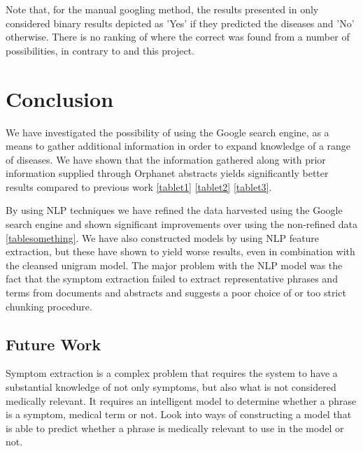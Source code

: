 \documentclass[10pt,letterpaper,final]{article}
\begin{document}

Note that, for the manual googling method, the results presented in
\cite{googlingdiagnosis} only considered binary results depicted as
'Yes' if they predicted the diseases and 'No' otherwise. There is no
ranking of where the correct was found from a number of possibilities,
in contrary to \cite{jensenandersen} and this project.




\section{Conclusion}
\label{chap:conclusion}
We have investigated the possibility of using the Google search engine,
as a means to gather additional information in order to expand knowledge
of a range of diseases. We have shown that the information gathered
along with prior information supplied through Orphanet abstracts yields
significantly better results compared to previous work \ref{tablet1}
\ref{tablet2} \ref{tablet3}.

By using NLP techniques we have refined the data harvested using the
Google search engine and shown significant improvements over using the
non-refined data \ref{tablesomething}. We have also constructed models
by using NLP feature extraction, but these have shown to yield worse
results, even in combination with the cleansed unigram model. The major
problem with the NLP model was the fact that the symptom extraction
failed to extract representative phrases and terms from documents and
abstracts and suggests a poor choice of or too strict chunking
procedure.





\subsection{Future Work}
Symptom extraction is a complex problem that requires the system to have
a substantial knowledge of not only symptoms, but also what is not
considered medically relevant. It requires an intelligent model to
determine whether a phrase is a symptom, medical term or not. Look into
ways of constructing a model that is able to predict whether a phrase
is medically relevant to use in the model or not.
\end{document}
